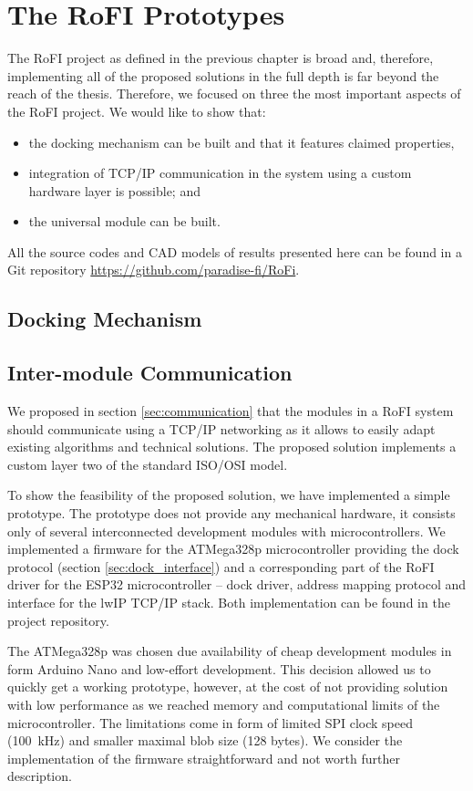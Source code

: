 \chapter{The RoFI Prototypes}\label{chap:prototypes}

The RoFI project as defined in the previous chapter is broad and, therefore,
implementing all of the proposed solutions in the full depth is far beyond the
reach of the thesis. Therefore, we focused on three the most important aspects
of the RoFI project. We would like to show that:
\begin{itemize}
    \item the docking mechanism can be built and that it features claimed
    properties,
    \item integration of TCP/IP communication in the system using a custom
    hardware layer is possible; and
    \item the universal module can be built.
\end{itemize}
All the source codes and CAD models of results presented here can be found in a
Git repository \url{https://github.com/paradise-fi/RoFi}.

\section{Docking Mechanism}

\section{Inter-module Communication}

We proposed in section \ref{sec:communication} that the modules in a RoFI system
should communicate using a TCP/IP networking as it allows to easily adapt
existing algorithms and technical solutions. The proposed solution implements a
custom layer two of the standard ISO/OSI model.

To show the feasibility of the proposed solution, we have implemented a simple
prototype. The prototype does not provide any mechanical hardware, it consists
only of several interconnected development modules with microcontrollers. We
implemented a firmware for the ATMega328p microcontroller providing the dock
protocol (section \ref{sec:dock_interface}) and a corresponding part of the RoFI
driver for the ESP32 microcontroller -- dock driver, address mapping protocol
and interface for the lwIP TCP/IP stack. Both implementation can be found in the
project repository.

The ATMega328p was chosen due availability of cheap development modules in form
Arduino Nano and low-effort development. This decision allowed us to quickly get
a working prototype, however, at the cost of not providing solution with low
performance as we reached memory and computational limits of the
microcontroller. The limitations come in form of limited SPI clock speed
(100~kHz) and smaller maximal blob size (128 bytes). We consider the
implementation of the firmware straightforward and not worth further
description.


